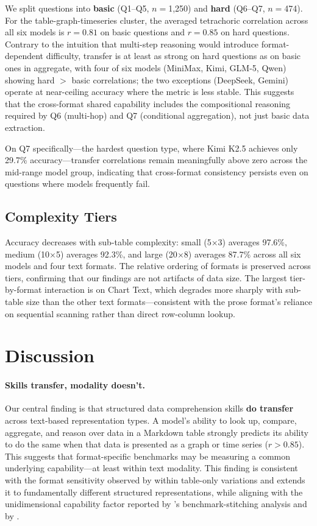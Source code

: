 \documentclass[11pt]{article}
\begin{document}
We split questions into \textbf{basic} (Q1--Q5, $n{=}$1,250) and \textbf{hard} (Q6--Q7, $n{=}$474). For the table-graph-timeseries cluster, the averaged tetrachoric correlation across all six models is $r{=}0.81$ on basic questions and $r{=}0.85$ on hard questions. Contrary to the intuition that multi-step reasoning would introduce format-dependent difficulty, transfer is at least as strong on hard questions as on basic ones in aggregate, with four of six models (MiniMax, Kimi, GLM-5, Qwen) showing hard $>$ basic correlations; the two exceptions (DeepSeek, Gemini) operate at near-ceiling accuracy where the metric is less stable. This suggests that the cross-format shared capability includes the compositional reasoning required by Q6 (multi-hop) and Q7 (conditional aggregation), not just basic data extraction.

On Q7 specifically---the hardest question type, where Kimi K2.5 achieves only 29.7\% accuracy---transfer correlations remain meaningfully above zero across the mid-range model group, indicating that cross-format consistency persists even on questions where models frequently fail.

\subsection{Complexity Tiers}

Accuracy decreases with sub-table complexity: small (5$\times$3) averages 97.6\%, medium (10$\times$5) averages 92.3\%, and large (20$\times$8) averages 87.7\% across all six models and four text formats. The relative ordering of formats is preserved across tiers, confirming that our findings are not artifacts of data size. The largest tier-by-format interaction is on Chart Text, which degrades more sharply with sub-table size than the other text formats---consistent with the prose format's reliance on sequential scanning rather than direct row-column lookup.

\section{Discussion}

\paragraph{Skills transfer, modality doesn't.} Our central finding is that structured data comprehension skills \textbf{do transfer} across text-based representation types. A model's ability to look up, compare, aggregate, and reason over data in a Markdown table strongly predicts its ability to do the same when that data is presented as a graph or time series ($r{>}0.85$). This suggests that format-specific benchmarks may be measuring a common underlying capability---at least within text modality. This finding is consistent with the format sensitivity observed by \citet{zhang2026samecontent} within table-only variations and extends it to fundamentally different structured representations, while aligning with the unidimensional capability factor reported by \citet{epoch2026}'s benchmark-stitching analysis and by \citet{ilic2023gfactor}.
\end{document}
